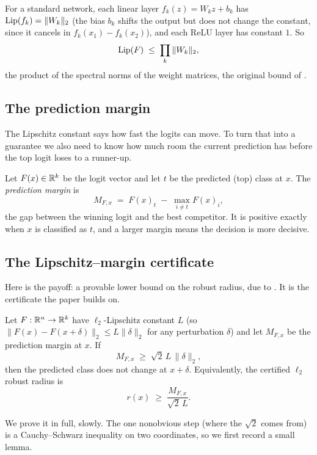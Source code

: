 For a standard network, each linear layer $f_k(z)=W_kz+b_k$ has $\operatorname{Lip}(f_k)=\|W_k\|_2$ (the bias $b_k$ shifts the output but does not change the constant, since it cancels in $f_k(x_1)-f_k(x_2)$), and each ReLU layer has constant $1$. So
\[
  \operatorname{Lip}(F) \;\le\; \prod_{k} \|W_k\|_2 ,
\]
the product of the spectral norms of the weight matrices, the original bound of \citet{szegedy2014intriguing}.

\subsection{The prediction margin}
\label{sub:margin}

The Lipschitz constant says how fast the logits can move. To turn that into a guarantee we also need to know how much room the current prediction has before the top logit loses to a runner-up.

\begin{definition}
Let $F(x)\in\mathbb{R}^k$ be the logit vector and let $t$ be the predicted (top) class at $x$. The \emph{prediction margin} is
\[
  M_{F,x} \;=\; F(x)_t \;-\; \max_{i\neq t} F(x)_i ,
\]
the gap between the winning logit and the best competitor. It is positive exactly when $x$ is classified as $t$, and a larger margin means the decision is more decisive.
\end{definition}

\subsection{The Lipschitz--margin certificate}
\label{sub:margin-cert}

Here is the payoff: a provable lower bound on the robust radius, due to \citet{tsuzuku2018lipschitz}. It is the certificate the paper builds on.

\begin{proposition}
\label{prop:tsuzuku}
Let $F:\mathbb{R}^n\to\mathbb{R}^k$ have $\ell_2$-Lipschitz constant $L$ (so $\|F(x)-F(x+\delta)\|_2\le L\|\delta\|_2$ for any perturbation $\delta$) and let $M_{F,x}$ be the prediction margin at $x$. If
\[
  M_{F,x} \;\ge\; \sqrt2\,L\,\|\delta\|_2 ,
\]
then the predicted class does not change at $x+\delta$. Equivalently, the certified $\ell_2$ robust radius is
\[
  r(x) \;\ge\; \frac{M_{F,x}}{\sqrt2\,L} .
\]
\end{proposition}

We prove it in full, slowly. The one nonobvious step (where the $\sqrt2$ comes from) is a Cauchy--Schwarz inequality on two coordinates, so we first record a small lemma.

